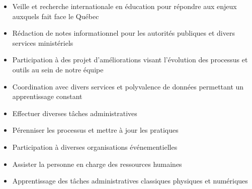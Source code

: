 \documentclass[10pt,a4paper,ragged2e,withhyper]{altacv}
\begin{document}
\begin{paracol}{2}


\begin{itemize}
\item Veille et recherche internationale en éducation pour répondre aux enjeux auxquels fait face le Québec
\item Rédaction de notes informationnel pour les autorités publiques et divers services ministériels
\item Participation à des projet d’améliorations visant l'évolution des processus et outils au sein de notre équipe
\item Coordination avec divers services et polyvalence de données permettant un apprentissage constant
\end{itemize}

\divider

\begin{itemize}
\item Effectuer diverses tâches administratives
\item Pérenniser les processus et mettre à jour les pratiques
\item Participation à diverses organisations événementielles 
\end{itemize}

\divider

\begin{itemize}
\item Assister la personne en charge des ressources humaines
\item Apprentissage des tâches administratives classiques physiques et numériques
\end{itemize}







\end{paracol}
\end{document}
